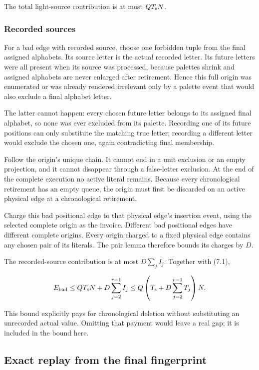 The total light-source contribution is at most \(QT_{\rm s}N\).

\subsubsection{Recorded sources}\label{recorded-sources}

For a bad edge with recorded source, choose one forbidden tuple from the final assigned alphabets. Its source letter is the actual recorded letter. Its future letters were all present when its source was processed, because palettes shrink and assigned alphabets are never enlarged after retirement. Hence this full origin was enumerated or was already rendered irrelevant only by a palette event that would also exclude a final alphabet letter.

The latter cannot happen: every chosen future letter belongs to its assigned final alphabet, so none was ever excluded from its palette. Recording one of its future positions can only substitute the matching true letter; recording a different letter would exclude the chosen one, again contradicting final membership.

Follow the origin's unique chain. It cannot end in a unit exclusion or an empty projection, and it cannot disappear through a false-letter exclusion. At the end of the complete execution no active literal remains. Because every chronological retirement has an empty queue, the origin must first be discarded on an active physical edge at a chronological retirement.

Charge this bad positional edge to that physical edge's insertion event, using the selected complete origin as the invoice. Different bad positional edges have different complete origins. Every origin charged to a fixed physical edge contains any chosen pair of its literals. The pair lemma therefore bounds its charges by \(D\).

The recorded-source contribution is at most \(D\sum_j I_j\). Together with (7.1),

\[
E_{\rm bad}
\le QT_{\rm s}N+D\sum_{j=2}^{r-1}I_j
\le Q\left(T_{\rm s}+D\sum_{j=2}^{r-1}T_j\right)N.
\]

This bound explicitly pays for chronological deletion without substituting an unrecorded actual value. Omitting that payment would leave a real gap; it is included in the bound here.

\subsection{Exact replay from the final fingerprint}\label{exact-replay-from-the-final-fingerprint}

